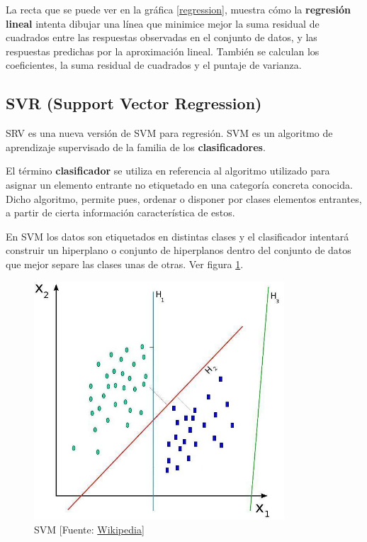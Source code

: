 	La recta que se puede ver en la gráfica \ref{regression}, muestra cómo la \textbf{regresión lineal} intenta dibujar una línea que minimice mejor la suma residual de cuadrados entre las respuestas observadas en el conjunto de datos, y las respuestas predichas por la aproximación lineal.
	También se calculan los coeficientes, la suma residual de cuadrados y el puntaje de varianza.

	\subsection{SVR (Support Vector Regression)}
	\label{makereference4.2.2}

	SRV es una nueva versión de SVM para regresión. SVM es un algoritmo de aprendizaje supervisado de la familia de los \textbf{clasificadores}.

	El término \textbf{clasificador} se utiliza en referencia al algoritmo utilizado para asignar un elemento entrante no etiquetado en una categoría concreta conocida. Dicho algoritmo, permite pues, ordenar o disponer por clases elementos entrantes, a partir de cierta información característica de estos.

	En SVM los datos son etiquetados en distintas clases y el clasificador intentará construir un hiperplano o conjunto de hiperplanos dentro del conjunto de datos que mejor separe las clases unas de otras. Ver figura \ref{svm}.

	\begin{figure}[htb]
		
		\begin{center}
			\includegraphics[height=3.5in]{figures/svm.jpg}
			\caption{SVM [Fuente: \href{www.wikipedia.org}{Wikipedia}]}
		\end{center}
		\label{svm}
	\end{figure}

